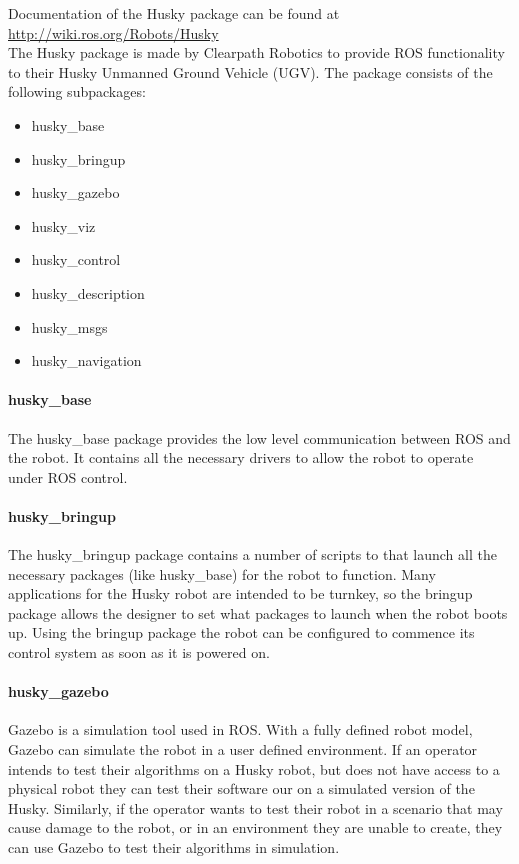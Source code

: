 Documentation of the Husky package can be found at \url{http://wiki.ros.org/Robots/Husky}\\

The Husky package is made by Clearpath Robotics to provide ROS functionality to their Husky Unmanned Ground Vehicle (UGV). The package consists of the following subpackages:

\begin{itemize}
    \item husky\_base
    \item husky\_bringup
    \item husky\_gazebo
    \item husky\_viz
    \item husky\_control
    \item husky\_description
    \item husky\_msgs
    \item husky\_navigation
\end{itemize}

\paragraph{husky\_base}

The husky\_base package provides the low level communication between ROS and the robot. It contains all the necessary drivers to allow the robot to operate under ROS control.\\

\paragraph{husky\_bringup}

The husky\_bringup package contains a number of scripts to that launch all the necessary packages (like husky\_base) for the robot to function. Many applications for the Husky robot are intended to be turnkey, so the bringup package allows the designer to set what packages to launch when the robot boots up. Using the bringup package the robot can be configured to commence its control system as soon as it is powered on.\\

\paragraph{husky\_gazebo}

Gazebo is a simulation tool used in ROS. With a fully defined robot model, Gazebo can simulate the robot in a user defined environment. If an operator intends to test their algorithms on a Husky robot, but does not have access to a physical robot they can test their software our on a simulated version of the Husky. Similarly, if the operator wants to test their robot in a scenario that may cause damage to the robot, or in an environment they are unable to create, they can use Gazebo to test their algorithms in simulation.\\

